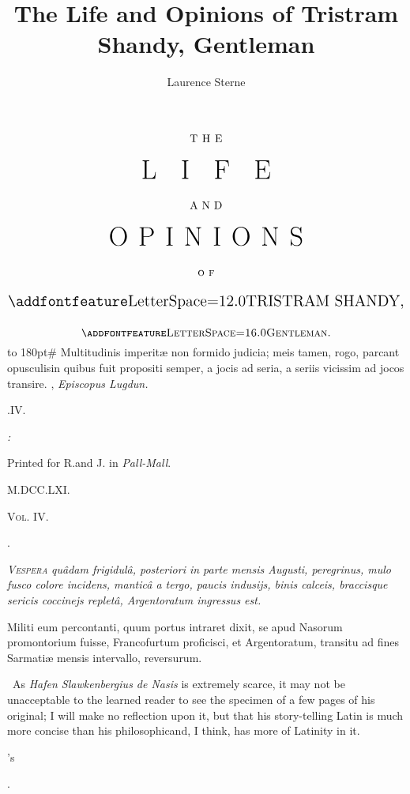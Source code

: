 \documentclass{article}
\title{The Life and Opinions of Tristram Shandy, Gentleman}
\author{Laurence Sterne}
\begin{document}
\pagestyle{empty}
\vfill
$$\vbox{\openup 16pt\halign{\hss #\hss\cr
\hbox to 3em{T H E}\cr
\hbox to 12em{\Huge L I F E}\cr
\hbox to 3em{A N D}\cr
\hbox to 18em{\Huge O P I N I O N S}\cr
\textsc{o f}\cr
\hbox{\Large \ls{TRISTRAM SHANDY},}\cr
\textsc{\lss{Gentleman}.}\cr
}}$$
\vfill
\newpage
\null
\newpage %
\pagestyle{empty}
\vbox{\openup 10pt}
\vfill
\vbox{\openup -2pt\halign to 180pt{\footnotesize #\cr
Multitudinis imperitæ non formido judicia; meis\cr
\quad tamen, rogo, parcant opusculis\tsh in quibus\cr
\quad fuit propositi semper, a jocis ad seria, a seriis\cr
\quad vicissim ad jocos transire.\hfill\cr
\hfill {},\cr
\hfill \textit{Episcopus Lugdun.}\cr}}
\vfill
\centerline{.\quad IV.}
\vfill
\centerline{\itshape{}:}
\centerline{\smaller Printed for R.\@ and J.\@ {} in \textit{Pall-Mall}.}
\centerline{M.DCC.LXI.}
\newpage
\null
\newpage
\null
\vfill
\noindent
\textsc{Vol. IV.}
\setcounter{page}{1}
\setlength{\baselineskip}{14pt}  %
\newpage
\centerline{\large{}}
\centerline{\large{}.}

\bgroup\itshape\def\emph#1{{\normalshape #1}}
\lettrine{V}{\enspace espera} quâdam frigidulâ,
posteriori in parte mensis \emph{Augusti}, peregrinus, mulo fusco
colore incidens, manticâ a tergo, paucis indusijs, binis
calceis, braccisque sericis coccinejs repletâ, \emph{Argentoratum}
ingressus est.

Militi eum percontanti, quum portus intraret dixit, se apud
Nasorum promontorium fuisse, Francofurtum proficisci, et
Argentoratum, transitu ad fines Sarmatiæ mensis intervallo,
reversurum.\egroup


\vfill
\bgroup\fontsize{8}{10}\selectfont\indent\fnast\ 
As \textit{Hafen Slawkenbergius de Nasis} is extremely scarce, it may not be
unacceptable to the learned reader to see the specimen of a few pages of his
original; I will make no reflection upon it, but that his story-telling Latin
is much more concise than his philosophic\tsk and, I think, has more of
Latinity in it.\par
\egroup
\newpage
\centerline{\large{}'s}
\centerline{\large{}.}
\end{document}
